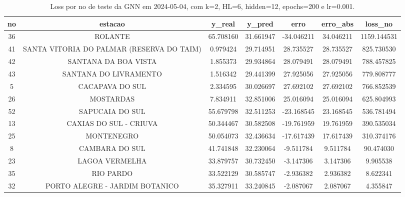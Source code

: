\begin{table}[h]
\centering
\caption{Loss por no de teste da GNN em 2024-05-04, com k=2, HL=6, hidden=12, epochs=200 e lr=0.001.}
\label{tab:gnn_loss_k2_hl6_h12_e200_d20240504}
\begin{tabular}{ccccccc}
\toprule
no & estacao & y\_real & y\_pred & erro & erro\_abs & loss\_no \\
\midrule
36 & ROLANTE & 65.708160 & 31.661947 & -34.046211 & 34.046211 & 1159.144531 \\
41 & SANTA VITORIA DO PALMAR (RESERVA DO TAIM) & 0.979424 & 29.714951 & 28.735527 & 28.735527 & 825.730530 \\
42 & SANTANA DA BOA VISTA & 1.855373 & 29.934864 & 28.079491 & 28.079491 & 788.457825 \\
43 & SANTANA DO LIVRAMENTO & 1.516342 & 29.441399 & 27.925056 & 27.925056 & 779.808777 \\
5 & CACAPAVA DO SUL & 2.334595 & 30.026697 & 27.692102 & 27.692102 & 766.852539 \\
26 & MOSTARDAS & 7.834911 & 32.851006 & 25.016094 & 25.016094 & 625.804993 \\
52 & SAPUCAIA DO SUL & 55.679798 & 32.511253 & -23.168545 & 23.168545 & 536.781494 \\
13 & CAXIAS DO SUL - CRIUVA & 50.344467 & 30.582508 & -19.761959 & 19.761959 & 390.535034 \\
25 & MONTENEGRO & 50.054073 & 32.436634 & -17.617439 & 17.617439 & 310.374176 \\
8 & CAMBARA DO SUL & 41.741848 & 32.230064 & -9.511784 & 9.511784 & 90.474030 \\
23 & LAGOA VERMELHA & 33.879757 & 30.732450 & -3.147306 & 3.147306 & 9.905538 \\
35 & RIO PARDO & 33.522129 & 30.585747 & -2.936382 & 2.936382 & 8.622341 \\
32 & PORTO ALEGRE - JARDIM BOTANICO & 35.327911 & 33.240845 & -2.087067 & 2.087067 & 4.355847 \\
\bottomrule
\end{tabular}
\end{table}
